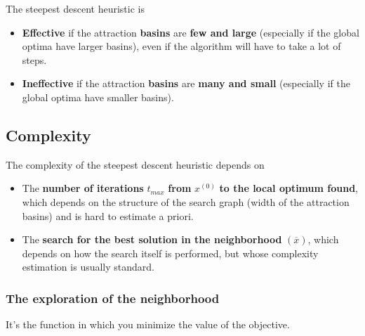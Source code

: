 \documentclass[11pt]{article}
\begin{document}
	The steepest descent heuristic is
	\begin{itemize}
		\item \textbf{Effective} if the attraction \textbf{basins} are \textbf{few and large} (especially if the global optima have larger basins), even if the algorithm will have to take a lot of steps.\\
		
		\item \textbf{Ineffective} if the attraction \textbf{basins} are \textbf{many and small} (especially if the global optima have smaller basins).\\
	\end{itemize}
	
	
	\newpage
	
	\subsection{Complexity}
	The complexity of the steepest descent heuristic depends on
	\begin{itemize}
		\item The \textbf{number of iterations} $t_{max}$ \textbf{from} $x^{(0)}$ \textbf{to the local optimum found}, which depends on the structure of the search graph (width of the attraction basins) and is hard to estimate a priori.\\
		
		\item The \textbf{search for the best solution in the neighborhood} $(\overline{x})$, which depends on how the search itself is performed, but whose complexity estimation is usually standard.\\
	\end{itemize}
	
	\subsubsection{The exploration of the neighborhood}
	It's the function in which you minimize the value of the objective.\\
	
\end{document}

